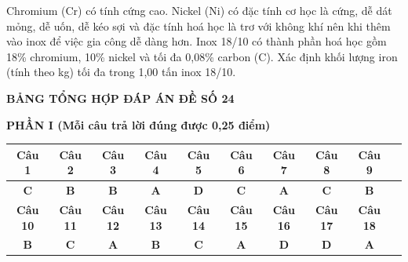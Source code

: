 \documentclass[11pt,a4paper]{article}
\begin{document}
\begin{ex}
Chromium (Cr) có tính cứng cao. Nickel (Ni) có đặc tính cơ học là cứng, dễ dát mỏng, dễ uốn, dễ kéo sợi và đặc tính hoá học là trơ với không khí nên khi thêm vào inox để việc gia công dễ dàng hơn. Inox 18/10 có thành phần hoá học gồm 18\% chromium, 10\% nickel và tối đa 0,08\% carbon (C). Xác định khối lượng iron (tính theo kg) tối đa trong 1,00 tấn inox 18/10.
\end{ex}



\newpage
\begin{center}
\textbf{\Large\color{hfRed}BẢNG TỔNG HỢP ĐÁP ÁN ĐỀ SỐ 24}
\end{center}

\vspace{0.2cm}
\noindent\textbf{\color{mainGreen}PHẦN I (Mỗi câu trả lời đúng được 0,25 điểm)}
\begin{center}
\renewcommand{\arraystretch}{1.2}
\begin{tabular}{|c|c|c|c|c|c|c|c|c|c|}
\hline
\textbf{Câu 1} & \textbf{Câu 2} & \textbf{Câu 3} & \textbf{Câu 4} & \textbf{Câu 5} & \textbf{Câu 6} & \textbf{Câu 7} & \textbf{Câu 8} & \textbf{Câu 9} \\
\hline
\textbf{\color{hfRed}C} & \textbf{\color{hfRed}B} & \textbf{\color{hfRed}B} & \textbf{\color{hfRed}A} & \textbf{\color{hfRed}D} & \textbf{\color{hfRed}C} & \textbf{\color{hfRed}A} & \textbf{\color{hfRed}C} & \textbf{\color{hfRed}B} \\
\hline
\textbf{Câu 10} & \textbf{Câu 11} & \textbf{Câu 12} & \textbf{Câu 13} & \textbf{Câu 14} & \textbf{Câu 15} & \textbf{Câu 16} & \textbf{Câu 17} & \textbf{Câu 18} \\
\hline
\textbf{\color{hfRed}B} & \textbf{\color{hfRed}C} & \textbf{\color{hfRed}A} & \textbf{\color{hfRed}B} & \textbf{\color{hfRed}C} & \textbf{\color{hfRed}A} & \textbf{\color{hfRed}D} & \textbf{\color{hfRed}D} & \textbf{\color{hfRed}A} \\
\hline
\end{tabular}
\end{center}
\end{document}
